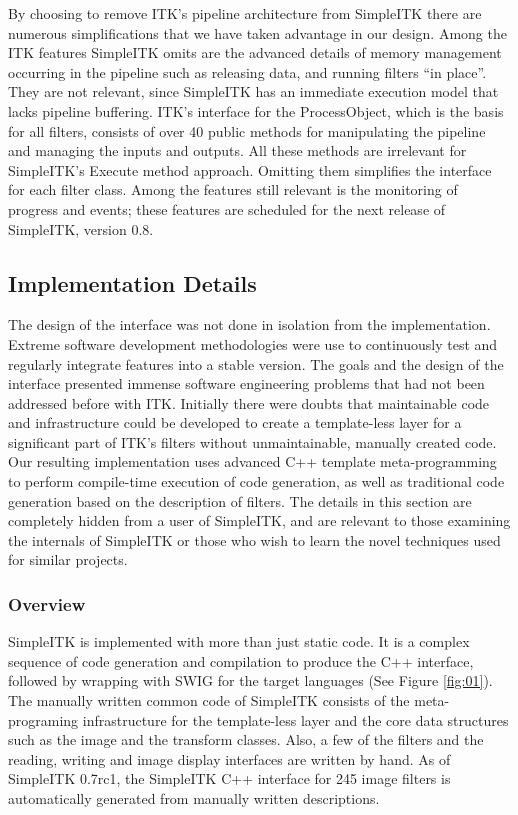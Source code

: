 \documentclass{frontiersMED} %
\begin{document}
By choosing to remove ITK's pipeline architecture from SimpleITK there
are numerous simplifications that we have taken advantage in our
design. Among the ITK features SimpleITK omits are the advanced
details of memory management occurring in the pipeline such as
releasing data, and running filters “in place”. They are not relevant,
since SimpleITK has an immediate execution model that lacks pipeline
buffering. ITK's interface for the ProcessObject, which is the basis
for all filters, consists of over 40 public methods for manipulating
the pipeline and managing the inputs and outputs. All these methods
are irrelevant for SimpleITK's Execute method approach. Omitting them
simplifies the interface for each filter class.  Among the features
still relevant is the monitoring of progress and events; these
features are scheduled for the next release of SimpleITK, version 0.8.

\subsection{Implementation Details}
The design of the interface was not done in isolation from the
implementation. Extreme software development methodologies were use to
continuously test and regularly integrate features into a stable
version.  The goals and the design of the interface presented immense
software engineering problems that had not been addressed before with
ITK. Initially there were doubts that maintainable code and
infrastructure could be developed to create a template-less layer for
a significant part of ITK's filters without unmaintainable, manually
created code. Our resulting implementation uses advanced C++ template
meta-programming to perform compile-time execution of code generation,
as well as traditional code generation based on the description of
filters. The details in this section are completely hidden from a user
of SimpleITK, and are relevant to those examining the internals of
SimpleITK or those who wish to learn the novel techniques used for
similar projects.

\subsubsection{Overview}
SimpleITK is implemented with more than just static code. It is a
complex sequence of code generation and compilation to produce the C++
interface, followed by wrapping with SWIG for the target
languages (See Figure \ref{fig:01}). The manually written common code of SimpleITK consists of
the meta-programing infrastructure for the template-less layer and the
core data structures such as the image and the transform
classes. Also, a few of the filters and the reading, writing and image
display interfaces are written by hand. As of SimpleITK 0.7rc1, the
SimpleITK C++ interface for 245 image filters is automatically
generated from manually written descriptions.
\end{document}
